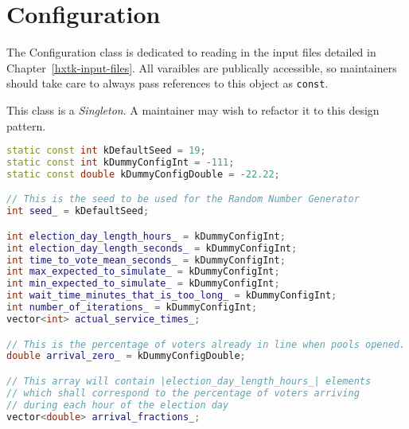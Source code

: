 %

\chapter{Configuration}

The Configuration class is dedicated to reading in the input files detailed in Chapter~\ref{hxtk-input-files}. All varaibles are publically accessible, so maintainers should take care to always pass references to this object as \texttt{const}.

This class is a \emph{Singleton}. A maintainer may wish to refactor it to this design pattern.

\begin{lstlisting}[language=C++]
static const int kDefaultSeed = 19;
static const int kDummyConfigInt = -111;
static const double kDummyConfigDouble = -22.22;

// This is the seed to be used for the Random Number Generator
int seed_ = kDefaultSeed;

int election_day_length_hours_ = kDummyConfigInt;
int election_day_length_seconds_ = kDummyConfigInt;
int time_to_vote_mean_seconds_ = kDummyConfigInt;
int max_expected_to_simulate_ = kDummyConfigInt;
int min_expected_to_simulate_ = kDummyConfigInt;
int wait_time_minutes_that_is_too_long_ = kDummyConfigInt;
int number_of_iterations_ = kDummyConfigInt;
vector<int> actual_service_times_;

// This is the percentage of voters already in line when pools opened.
double arrival_zero_ = kDummyConfigDouble;

// This array will contain |election_day_length_hours_| elements
// which shall correspond to the percentage of voters arriving
// during each hour of the election day
vector<double> arrival_fractions_;
\end{lstlisting}